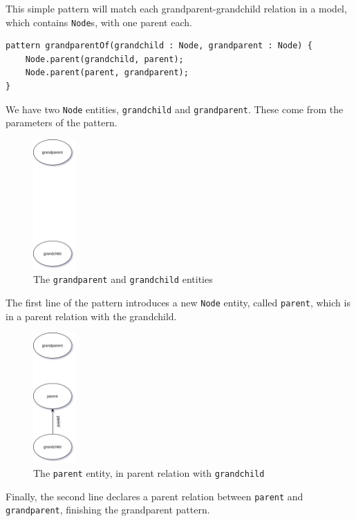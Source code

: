 \documentclass[11pt,a4paper,oneside]{report}
\begin{document}
This simple pattern will match each grandparent-grandchild relation in a model,
which contains \texttt{Node}s, with one parent each.

\begin{lstlisting}[frame=single]
pattern grandparentOf(grandchild : Node, grandparent : Node) {
    Node.parent(grandchild, parent);
    Node.parent(parent, grandparent);
}
\end{lstlisting}

We have two \texttt{Node} entities, \texttt{grandchild} and
\texttt{grandparent}. These come from the parameters of the pattern.

\begin{figure}[!htbp]
\centering
\includegraphics[height=50mm, keepaspectratio]{figures/basic-pattern-explanation-1.png}
\caption{The \texttt{grandparent} and \texttt{grandchild} entities}
\label{fig:basic-pattern-explanation-1}
\end{figure}

The first line of the pattern introduces a new \texttt{Node} entity, called
\texttt{parent}, which is in a parent relation with the grandchild.

\begin{figure}[!htbp]
\centering
\includegraphics[height=50mm, keepaspectratio]{figures/basic-pattern-explanation-2.png}
\caption{The \texttt{parent} entity, in parent relation with \texttt{grandchild}}
\label{fig:basic-pattern-explanation-2}
\end{figure}

\pagebreak
Finally, the second line declares a parent relation between \texttt{parent} and
\texttt{grandparent}, finishing the grandparent pattern.
\end{document}
